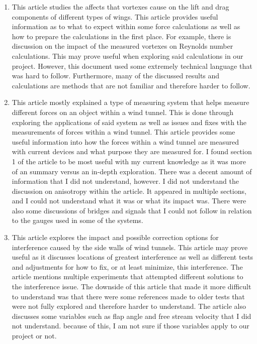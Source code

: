 \documentclass[12pt,letterpaper]{article}
\begin{document}
\begin{enumerate}
	
	\item \cite{Gerontakos2007} This article studies the affects that vortexes cause on the lift and drag components of different types of wings. This article provides useful information as to what to expect within some force calculations as well as how to prepare the calculations in the first place. For example, there is discussion on the impact of the measured vortexes on Reynolds number calculations. This may prove useful when exploring said calculations in our project. However, this document used some extremely technical language that was hard to follow. Furthermore, many of the discussed results and calculations are methods that are not familiar and therefore harder to follow.
	
	\item \cite{Portman2009} This article mostly explained a type of measuring system that helps measure different forces on an object within a wind tunnel. This is done through exploring the applications of said system as well as issues and fixes with the measurements of forces within a wind tunnel. This article provides some useful information into how the forces within a wind tunnel are measured with current devices and what purpose they are measured for. I found section 1 of the article to be most useful with my current knowledge as it was more of an summary versus an in-depth exploration. There was a decent amount of information that I did not understand, however. I did not understand the discussion on anisotropy within the article. It appeared in multiple sections, and I could not understand what it was or what its impact was. There were also some discussions of bridges and signals that I could not follow in relation to the gauges used in some of the systems.
	
	\item \cite{Motohashi1983} This article explores the impact and possible correction options for interference caused by the side walls of wind tunnels. This article may prove useful as it discusses locations of greatest interference as well as different tests and adjustments for how to fix, or at least minimize, this interference. The article mentions multiple experiments that attempted different solutions to the interference issue. The downside of this article that made it more difficult to understand was that there were some references made to older tests that were not fully explored and therefore harder to understand. The article also discusses some variables such as flap angle and free stream velocity that I did not understand. because of this, I am not sure if those variables apply to our project or not.


\end{enumerate}
\end{document}
